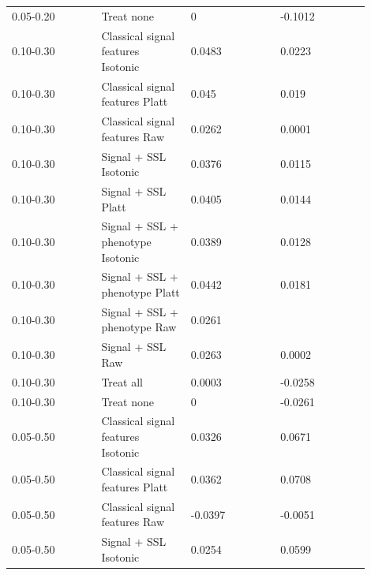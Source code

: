 \documentclass[utf8]{frontiers_suppmat}
\begin{document}
\begin{landscape}
\begin{longtable}{L{0.225\linewidth} L{0.225\linewidth} L{0.225\linewidth} L{0.225\linewidth}}
0.\allowbreak{}05-\allowbreak{}0.\allowbreak{}20 & Treat none & 0 & -\allowbreak{}0.\allowbreak{}1012 \\
0.\allowbreak{}10-\allowbreak{}0.\allowbreak{}30 & Classical signal features Isotonic & 0.\allowbreak{}0483 & 0.\allowbreak{}0223 \\
0.\allowbreak{}10-\allowbreak{}0.\allowbreak{}30 & Classical signal features Platt & 0.\allowbreak{}045 & 0.\allowbreak{}019 \\
0.\allowbreak{}10-\allowbreak{}0.\allowbreak{}30 & Classical signal features Raw & 0.\allowbreak{}0262 & 0.\allowbreak{}0001 \\
0.\allowbreak{}10-\allowbreak{}0.\allowbreak{}30 & Signal + SSL Isotonic & 0.\allowbreak{}0376 & 0.\allowbreak{}0115 \\
0.\allowbreak{}10-\allowbreak{}0.\allowbreak{}30 & Signal + SSL Platt & 0.\allowbreak{}0405 & 0.\allowbreak{}0144 \\
0.\allowbreak{}10-\allowbreak{}0.\allowbreak{}30 & Signal + SSL + phenotype Isotonic & 0.\allowbreak{}0389 & 0.\allowbreak{}0128 \\
0.\allowbreak{}10-\allowbreak{}0.\allowbreak{}30 & Signal + SSL + phenotype Platt & 0.\allowbreak{}0442 & 0.\allowbreak{}0181 \\
0.\allowbreak{}10-\allowbreak{}0.\allowbreak{}30 & Signal + SSL + phenotype Raw & 0.\allowbreak{}0261 &  \\
0.\allowbreak{}10-\allowbreak{}0.\allowbreak{}30 & Signal + SSL Raw & 0.\allowbreak{}0263 & 0.\allowbreak{}0002 \\
0.\allowbreak{}10-\allowbreak{}0.\allowbreak{}30 & Treat all & 0.\allowbreak{}0003 & -\allowbreak{}0.\allowbreak{}0258 \\
0.\allowbreak{}10-\allowbreak{}0.\allowbreak{}30 & Treat none & 0 & -\allowbreak{}0.\allowbreak{}0261 \\
0.\allowbreak{}05-\allowbreak{}0.\allowbreak{}50 & Classical signal features Isotonic & 0.\allowbreak{}0326 & 0.\allowbreak{}0671 \\
0.\allowbreak{}05-\allowbreak{}0.\allowbreak{}50 & Classical signal features Platt & 0.\allowbreak{}0362 & 0.\allowbreak{}0708 \\
0.\allowbreak{}05-\allowbreak{}0.\allowbreak{}50 & Classical signal features Raw & -\allowbreak{}0.\allowbreak{}0397 & -\allowbreak{}0.\allowbreak{}0051 \\
0.\allowbreak{}05-\allowbreak{}0.\allowbreak{}50 & Signal + SSL Isotonic & 0.\allowbreak{}0254 & 0.\allowbreak{}0599 \\

\end{longtable}
\end{landscape}
\end{document}
